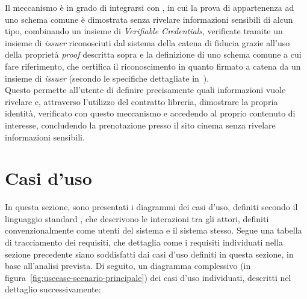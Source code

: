 Il meccanismo è in grado di integrarsi con , in cui la prova di appartenenza ad uno schema comune è dimostrata
senza rivelare informazioni sensibili di alcun tipo, combinando un insieme di \textit{Verifiable Credentials}, verificate tramite 
un insieme di \textit{issuer} riconosciuti dal sistema della catena di fiducia grazie all'uso della proprietà \textit{proof} descritta sopra
e la definizione di uno schema comune a cui fare riferimento, che certifica il riconoscimento in quanto firmato a catena da un insieme di \textit{issuer}
(secondo le specifiche dettagliate in~\cite{site:zkpw3c}). \\
Questo permette all'utente di definire precisamente quali informazioni vuole rivelare e, attraverso l'utilizzo del contratto libreria, 
dimostrare la propria identità, verificato con questo meccanismo e accedendo al proprio contenuto di interesse, concludendo la prenotazione 
presso il sito cinema senza rivelare informazioni sensibili. 

\section{Casi d'uso}\label{sec:usecase}

In questa sezione, sono presentati i diagrammi dei casi d'uso, definiti secondo il linguaggio standard ,
che descrivono le interazioni tra gli attori, definiti convenzionalmente come utenti del sistema e il sistema stesso. 
Segue una tabella di tracciamento dei requisiti, che dettaglia come i requisiti individuati nella sezione precedente siano soddisfatti
dai casi d'uso definiti in questa sezione, in base all'analisi prevista. 
Di seguito, un diagramma complessivo (in figura~\ref{fig:usecase-scenario-principale}) dei casi d'uso individuati, descritti nel dettaglio successivamente: \\

